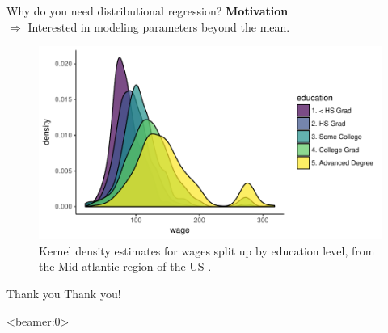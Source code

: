 \documentclass[xcolor=dvipsnames, t]{beamer}
\begin{document}
\begin{frame}{Why do you need distributional regression?}
	\textbf{Motivation} \\
	$\boldsymbol{\Rightarrow}$ Interested in modeling parameters beyond the mean.
	\pause
	\begin{figure}
		\begin{centering}
			\includegraphics[scale = 0.6, trim = {0cm 0.5cm 0cm 0cm }]{images/030_wage_plot.pdf}
			\caption{Kernel density estimates for wages split up by education level, from the Mid-atlantic region of the US \citep{ISLR}.}
			\label{wage_density}
		\end{centering}
	\end{figure}
\end{frame}


\begin{frame}[c]{Thank you}
	\centering
	Thank you!
\end{frame}

\begin{frame}<beamer:0>
  
  
\end{frame}
\end{document}
